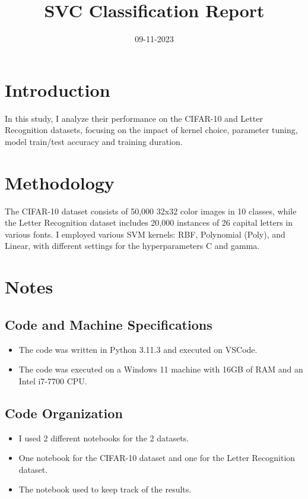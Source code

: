 \documentclass[conference]{IEEEtran}
\title{\Huge SVC Classification Report}
\author{\IEEEauthorblockN{Papagrigoriou Vasileios Savvas}
\IEEEauthorblockA{Auth}}
\date{09-11-2023}
\begin{document}
\maketitle

\section{Introduction}
In this study, I analyze their performance on the CIFAR-10 and Letter Recognition datasets, focusing on the impact of kernel choice, parameter tuning, model train/test accuracy and training duration.

\section{Methodology}
The CIFAR-10 dataset consists of 50,000 32x32 color images in 10 classes, while the Letter Recognition dataset includes 20,000 instances of 26 capital letters in various fonts. I employed various SVM kernels: RBF, Polynomial (Poly), and Linear, with different settings for the hyperparameters C and gamma.

\section{Notes}
\subsection{Code and Machine Specifications}

\begin{itemize}
\item The code was written in Python 3.11.3 and executed on VSCode. 
\item The code was executed on a Windows 11 machine with 16GB of RAM and an Intel i7-7700 CPU. 
\end{itemize}

\subsection{Code Organization}

\begin{itemize}
\item I used 2 different notebooks for the 2 datasets.
\item One notebook for the CIFAR-10 dataset and one for the Letter Recognition dataset.
\item The notebook used to keep track of the results.
\end{itemize}
\end{document}
